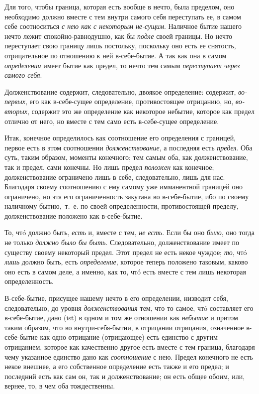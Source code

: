 Для того, чтобы граница, которая есть вообще в нечто, была пределом, оно
необходимо должно вместе с тем внутри самого себя переступать ее, в самом
себе соотноситься {\em с нею как с некоторым не-сущим}.
Наличное бытие нашего нечто лежит спокойно-равнодушно, как бы
{\em подле} своей границы. Но нечто переступает свою
границу лишь постольку, поскольку оно есть ее снятость, отрицательное по
отношению к ней в-себе-бытие. А так как она в самом
{\em определении} имеет бытие как предел, то нечто тем
самым {\em переступает через самого себя}.

Долженствование содержит, следовательно, двоякое определение: содержит,
{\em во-первых}, его как в-себе-сущее определение,
противостоящее отрицанию, но, {\em во-вторых}, содержит
это же определение как некоторое небытие, которое как предел отлично от
него, но вместе с тем само есть в-себе-сущее определение.

Итак, конечное определилось как соотношение его определения с границей,
первое есть в этом соотношении {\em долженствование}, а
последняя есть {\em предел}. Оба суть, таким образом,
моменты конечного; тем самым оба, как долженствование, так и предел, сами
конечны. Но лишь предел {\em положен} как конечное;
долженствование ограничено лишь в себе, следовательно, лишь для нас.
Благодаря своему соотношению с ему самому уже имманентной границей оно
ограничено, но эта его ограниченность закутана во в-себе-бытие, ибо по
своему наличному бытию,~т.~е. по своей определенности, противостоящей
пределу, долженствование положено как в-себе-бытие.

То, чтó должно быть, {\em есть} и, вместе с тем,
{\em не есть}. Если бы оно
{\em было}, оно тогда не только
{\em должно было бы быть}. Следовательно,
долженствование имеет по существу своему некоторый предел. Этот предел не
есть некое чуждое; {\em то}, чтó
{\em лишь} должно быть, есть
{\em определение}, которое теперь положено таковым,
каково оно есть в самом деле, а именно, как то, чтó есть вместе с тем лишь
некоторая определенность.

В-себе-бытие, присущее нашему нечто в его определении, низводит себя,
следовательно, до уровня {\em долженствования} тем, что
то самое, чтó составляет его в-себе-бытие, дано (ist) в одном и том же
отношении как {\em небытие} и притом таким образом, что
во внутри-себя-бытии, в отрицании отрицания, означенное в-себе-бытие как
одно отрицание (отрицающее) есть единство с другим отрицанием, которое как
качественно другое есть вместе с тем граница, благодаря чему указанное
единство дано как {\em соотношение} с нею. Предел
конечного не есть некое внешнее, а его собственное определение есть также и
его предел; и последний есть как сам он, так и долженствование; он есть
общее обоим, или, вернее, то, в чем оба тождественны.

